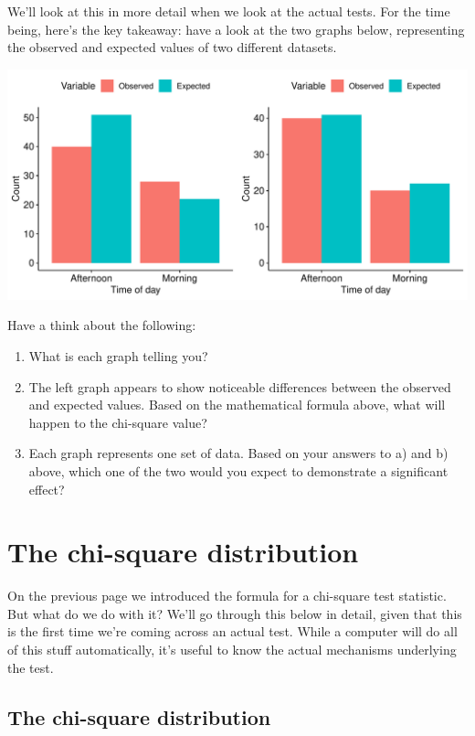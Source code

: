 \documentclass[
]{book}
\begin{document}
We'll look at this in more detail when we look at the actual tests. For the time being, here's the key takeaway: have a look at the two graphs below, representing the observed and expected values of two different datasets.

\includegraphics{_main_files/figure-latex/unnamed-chunk-108-1.pdf}

Have a think about the following:

\begin{enumerate}
\def\labelenumi{\arabic{enumi}.}
\item
  What is each graph telling you?
\item
  The left graph appears to show noticeable differences between the observed and expected values. Based on the mathematical formula above, what will happen to the chi-square value?
\item
  Each graph represents one set of data. Based on your answers to a) and b) above, which one of the two would you expect to demonstrate a significant effect?
\end{enumerate}

\section{The chi-square distribution}\label{the-chi-square-distribution}

On the previous page we introduced the formula for a chi-square test statistic. But what do we do with it? We'll go through this below in detail, given that this is the first time we're coming across an actual test. While a computer will do all of this stuff automatically, it's useful to know the actual mechanisms underlying the test.

\subsection{The chi-square distribution}\label{the-chi-square-distribution-1}
\end{document}
